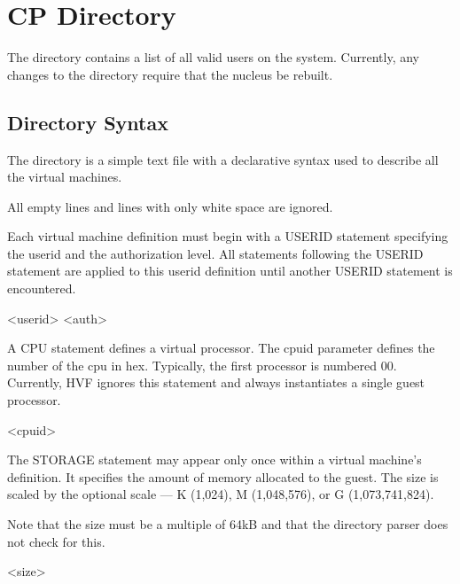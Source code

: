 \chapter{CP Directory}
The directory contains a list of all valid users on the system.  Currently,
any changes to the directory require that the nucleus be rebuilt.

\section{Directory Syntax}
The directory is a simple text file with a declarative syntax used to
describe all the virtual machines.

All empty lines and lines with only white space are ignored.

Each virtual machine definition must begin with a USERID statement
specifying the userid and the authorization level.  All statements following
the USERID statement are applied to this userid definition until another
USERID statement is encountered.

\begin{syntdiag}
 <userid> <auth>
\end{syntdiag}

A CPU statement defines a virtual processor.  The cpuid parameter defines
the number of the cpu in hex.  Typically, the first processor is numbered
00.  Currently, HVF ignores this statement and always instantiates a single
guest processor.

\begin{syntdiag}
 <cpuid>
\end{syntdiag}

The STORAGE statement may appear only once within a virtual machine's
definition.  It specifies the amount of memory allocated to the guest.  The
size is scaled by the optional scale --- K (\mbox{1,024}), M
(\mbox{1,048,576}), or G (\mbox{1,073,741,824}).

Note that the size must be a multiple of 64kB and that the directory parser
does not check for this.

\begin{syntdiag}
 <size>
\begin{stack}
	\\
	 \\
	 \\
\end{stack}
\end{syntdiag}

